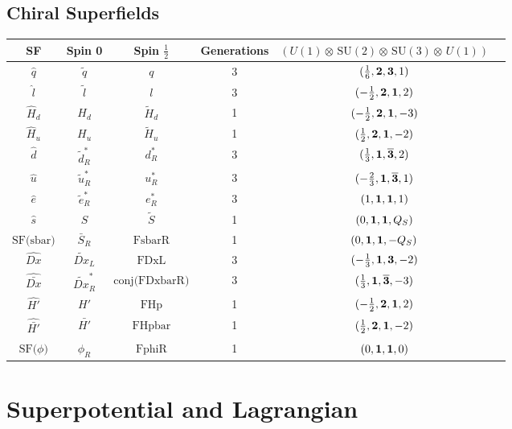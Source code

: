 \subsection{Chiral Superfields} 
\begin{center} 
\begin{tabular}{|c|c|c|c|c|c|} 
\hline \hline 
SF & Spin 0 & Spin \(\frac{1}{2}\) & Generations & \((U(1)\otimes\, \text{SU}(2)\otimes\, \text{SU}(3)\otimes\, U(1))\) \\ 
\hline 
\(\hat{q}\) & \(\tilde{q}\) & \(q\) & 3 & \((\frac{1}{6},{\bf 2},{\bf 3},1) \) \\ 
\(\hat{l}\) & \(\tilde{l}\) & \(l\) & 3 & \((-\frac{1}{2},{\bf 2},{\bf 1},2) \) \\ 
\(\hat{H}_d\) & \(H_d\) & \(\tilde{H}_d\) & 1 & \((-\frac{1}{2},{\bf 2},{\bf 1},-3) \) \\ 
\(\hat{H}_u\) & \(H_u\) & \(\tilde{H}_u\) & 1 & \((\frac{1}{2},{\bf 2},{\bf 1},-2) \) \\ 
\(\hat{d}\) & \(\tilde{d}_R^*\) & \(d_R^*\) & 3 & \((\frac{1}{3},{\bf 1},{\bf \overline{3}},2) \) \\ 
\(\hat{u}\) & \(\tilde{u}_R^*\) & \(u_R^*\) & 3 & \((-\frac{2}{3},{\bf 1},{\bf \overline{3}},1) \) \\ 
\(\hat{e}\) & \(\tilde{e}_R^*\) & \(e_R^*\) & 3 & \((1,{\bf 1},{\bf 1},1) \) \\ 
\(\hat{s}\) & \(S\) & \(\tilde{S}\) & 1 & \((0,{\bf 1},{\bf 1},Q_{S}) \) \\ 
\(\text{SF}\Big(\text{sbar}\Big)\) & \(\bar{S}_R\) & \(\text{FsbarR}\) & 1 & \((0,{\bf 1},{\bf 1},- Q_{S} ) \) \\ 
\(\hat{Dx}\) & \(\tilde{Dx}_L\) & \(\text{FDxL}\) & 3 & \((-\frac{1}{3},{\bf 1},{\bf 3},-2) \) \\ 
\(\hat{\bar{Dx}}\) & \(\tilde{Dx}_R^*\) & \(\text{conj}\Big(\text{FDxbarR}\Big)\) & 3 & \((\frac{1}{3},{\bf 1},{\bf \overline{3}},-3) \) \\ 
\(\hat{H'}\) & \(H'\) & \(\text{FHp}\) & 1 & \((-\frac{1}{2},{\bf 2},{\bf 1},2) \) \\ 
\(\hat{\bar{H'}}\) & \(\bar{H'}\) & \(\text{FHpbar}\) & 1 & \((\frac{1}{2},{\bf 2},{\bf 1},-2) \) \\ 
\(\text{SF}\Big(\phi \Big)\) & \(\phi_R\) & \(\text{FphiR}\) & 1 & \((0,{\bf 1},{\bf 1},0) \) \\ 
\hline \hline
\end{tabular} 
\end{center} 
\section{Superpotential and Lagrangian} 
